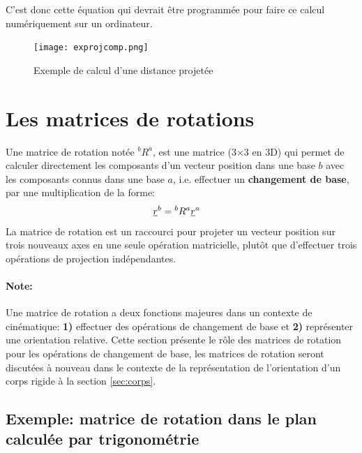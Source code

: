 C'est donc cette équation qui devrait être programmée pour faire ce calcul numériquement sur un ordinateur.
\begin{figure}[htbp]
	\centering
		\texttt{[image: exprojcomp.png]}
	\caption{Exemple de calcul d'une distance projetée}
	\label{fig:exprojcomp}
\end{figure}



\newpage
\section{Les matrices de rotations}
\label{sec:changematrice}

Une matrice de rotation notée $^bR^a$, est une matrice (3$\times$3 en 3D) qui permet de calculer directement les composants d'un vecteur position dans une base $b$ avec les composants connus dans une base $a$, i.e. effectuer un \textbf{changement de base}, par une multiplication de la forme:
\begin{align}
\underline{r}^b &= {}^bR^a \underline{r}^a
\label{eq:basechange}
\end{align} 
La matrice de rotation est un raccourci pour projeter un vecteur position sur trois nouveaux axes en une seule opération matricielle, plutôt que d'effectuer trois opérations de projection indépendantes. 

\paragraph{Note:} Une matrice de rotation a deux fonctions majeures dans un contexte de cinématique: \textbf{1)} effectuer des opérations de changement de base et \textbf{2)} représenter une orientation relative. Cette section présente le rôle des matrices de rotation pour les opérations de changement de base, les matrices de rotation seront discutées à nouveau dans le contexte de la représentation de l'orientation d'un corps rigide à la section \ref{sec:corps}.


\subsection{Exemple: matrice de rotation dans le plan calculée par trigonométrie}

